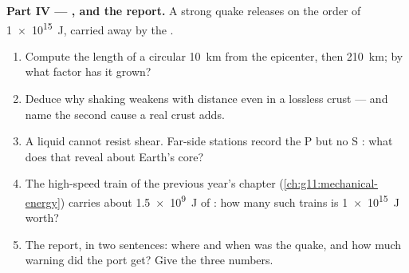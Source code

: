 \begin{problem}
\medskip
\noindent\textbf{Part IV --- , and the report.}
A strong quake releases on the order of \qty{1e15}{J}, carried away by
the .
\begin{enumerate}[resume]
  \item Compute the length of a circular  \qty{10}{km} from
        the epicenter, then \qty{210}{km}; by what factor has it grown?
  \item Deduce why shaking weakens with distance even in a lossless
        crust --- and name the second cause a real crust adds.
  \item A liquid cannot resist shear. Far-side stations record the P
         but no S : what does that reveal about Earth's core?
  \item The high-speed train of the previous year's  chapter
        (\cref{ch:g11:mechanical-energy}) carries about \qty{1.5e9}{J}
        of : how many such trains is \qty{1e15}{J} worth?
  \item The report, in two sentences: where and when was the quake,
        and how much warning did the port get? Give the three numbers.
\end{enumerate}
\end{problem}
